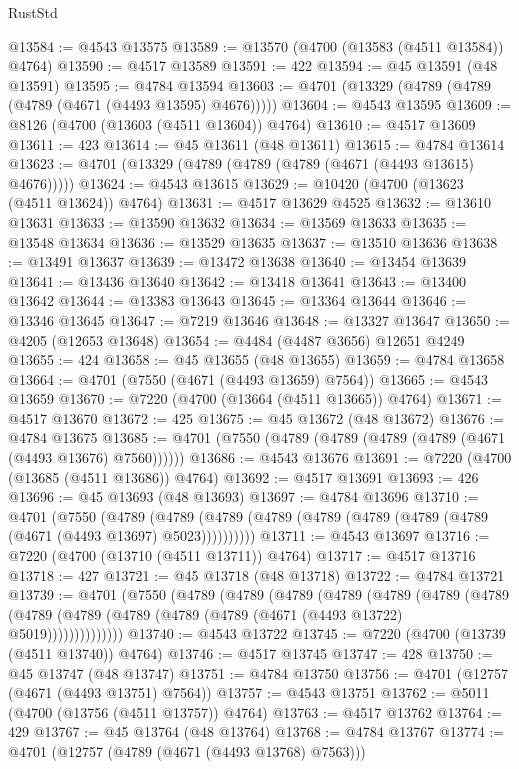 \begin{lexlean}{RustStd}
\begin{coremodule}
@13584 := @4543 @13575
@13589 := @13570 (@4700 (@13583 (@4511 @13584)) @4764)
@13590 := @4517 @13589
@13591 := 422
@13594 := @45 @13591 (@48 @13591)
@13595 := @4784 @13594
@13603 := @4701 (@13329 (@4789 (@4789 (@4789 (@4671 (@4493 @13595) @4676)))))
@13604 := @4543 @13595
@13609 := @8126 (@4700 (@13603 (@4511 @13604)) @4764)
@13610 := @4517 @13609
@13611 := 423
@13614 := @45 @13611 (@48 @13611)
@13615 := @4784 @13614
@13623 := @4701 (@13329 (@4789 (@4789 (@4789 (@4671 (@4493 @13615) @4676)))))
@13624 := @4543 @13615
@13629 := @10420 (@4700 (@13623 (@4511 @13624)) @4764)
@13631 := @4517 @13629 @4525
@13632 := @13610 @13631
@13633 := @13590 @13632
@13634 := @13569 @13633
@13635 := @13548 @13634
@13636 := @13529 @13635
@13637 := @13510 @13636
@13638 := @13491 @13637
@13639 := @13472 @13638
@13640 := @13454 @13639
@13641 := @13436 @13640
@13642 := @13418 @13641
@13643 := @13400 @13642
@13644 := @13383 @13643
@13645 := @13364 @13644
@13646 := @13346 @13645
@13647 := @7219 @13646
@13648 := @13327 @13647
@13650 := @4205 (@12653 @13648)
@13654 := @4484 (@4487 @3656) @12651 @4249
@13655 := 424
@13658 := @45 @13655 (@48 @13655)
@13659 := @4784 @13658
@13664 := @4701 (@7550 (@4671 (@4493 @13659) @7564))
@13665 := @4543 @13659
@13670 := @7220 (@4700 (@13664 (@4511 @13665)) @4764)
@13671 := @4517 @13670
@13672 := 425
@13675 := @45 @13672 (@48 @13672)
@13676 := @4784 @13675
@13685 := @4701 (@7550 (@4789 (@4789 (@4789 (@4789 (@4671 (@4493 @13676) @7560))))))
@13686 := @4543 @13676
@13691 := @7220 (@4700 (@13685 (@4511 @13686)) @4764)
@13692 := @4517 @13691
@13693 := 426
@13696 := @45 @13693 (@48 @13693)
@13697 := @4784 @13696
@13710 := @4701
    (@7550
      (@4789 (@4789 (@4789 (@4789 (@4789 (@4789 (@4789 (@4789 (@4671 (@4493 @13697) @5023))))))))))
@13711 := @4543 @13697
@13716 := @7220 (@4700 (@13710 (@4511 @13711)) @4764)
@13717 := @4517 @13716
@13718 := 427
@13721 := @45 @13718 (@48 @13718)
@13722 := @4784 @13721
@13739 := @4701
    (@7550
      (@4789
        (@4789
          (@4789
            (@4789
              (@4789
                (@4789
                  (@4789
                    (@4789 (@4789 (@4789 (@4789 (@4789 (@4671 (@4493 @13722) @5019))))))))))))))
@13740 := @4543 @13722
@13745 := @7220 (@4700 (@13739 (@4511 @13740)) @4764)
@13746 := @4517 @13745
@13747 := 428
@13750 := @45 @13747 (@48 @13747)
@13751 := @4784 @13750
@13756 := @4701 (@12757 (@4671 (@4493 @13751) @7564))
@13757 := @4543 @13751
@13762 := @5011 (@4700 (@13756 (@4511 @13757)) @4764)
@13763 := @4517 @13762
@13764 := 429
@13767 := @45 @13764 (@48 @13764)
@13768 := @4784 @13767
@13774 := @4701 (@12757 (@4789 (@4671 (@4493 @13768) @7563)))

\end{coremodule}
\end{lexlean}
